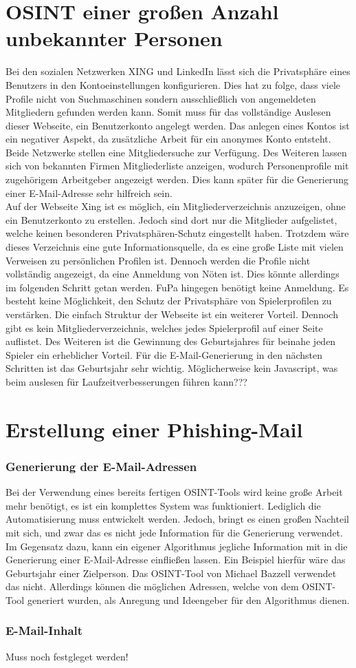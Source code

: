 \section{OSINT einer großen Anzahl unbekannter Personen}
Bei den sozialen Netzwerken XING und LinkedIn lässt sich die Privatsphäre eines Benutzers in den Kontoeinstellungen konfigurieren. Dies hat zu folge, dass viele Profile nicht von Suchmaschinen sondern ausschließlich von angemeldeten Mitgliedern gefunden werden kann. Somit muss für das vollständige Auslesen dieser Webseite, ein Benutzerkonto angelegt werden. Das anlegen eines Kontos ist ein negativer Aspekt, da zusätzliche Arbeit für ein anonymes Konto entsteht.\\ Beide Netzwerke stellen eine Mitgliedersuche zur Verfügung. Des Weiteren lassen sich von bekannten Firmen Mitgliederliste anzeigen, wodurch Personenprofile mit zugehörigem Arbeitgeber angezeigt werden. Dies kann später für die Generierung einer E-Mail-Adresse sehr hilfreich sein.\\
Auf der Webseite Xing ist es möglich, ein Mitgliederverzeichnis anzuzeigen, ohne ein Benutzerkonto zu erstellen. Jedoch sind dort nur die Mitglieder aufgelistet, welche keinen besonderen Privatsphären-Schutz eingestellt haben. Trotzdem wäre dieses Verzeichnis eine gute Informationsquelle, da es eine große Liste mit vielen Verweisen zu persönlichen Profilen ist. Dennoch werden die Profile nicht vollständig angezeigt, da eine Anmeldung von Nöten ist. Dies könnte allerdings im folgenden Schritt getan werden.
FuPa hingegen benötigt keine Anmeldung. Es besteht keine Möglichkeit, den Schutz der Privatsphäre von Spielerprofilen zu verstärken. Die einfach Struktur der Webseite ist ein weiterer Vorteil. Dennoch gibt es kein Mitgliederverzeichnis, welches jedes Spielerprofil auf einer Seite auflistet. Des Weiteren ist die Gewinnung des Geburtsjahres für beinahe jeden Spieler ein erheblicher Vorteil. Für die E-Mail-Generierung in den nächsten Schritten ist das Geburtsjahr sehr wichtig. Möglicherweise kein Javascript, was beim auslesen für Laufzeitverbesserungen führen kann???

\section{Erstellung einer Phishing-Mail}
	\subsubsection{Generierung der E-Mail-Adressen}
	Bei der Verwendung eines bereits fertigen OSINT-Tools wird keine große Arbeit mehr benötigt, es ist ein komplettes System was funktioniert. Lediglich die Automatisierung muss entwickelt werden. Jedoch, bringt es einen großen Nachteil mit sich, und zwar das es nicht jede Information für die Generierung verwendet. Im Gegensatz dazu, kann ein eigener Algorithmus jegliche Information mit in die Generierung einer E-Mail-Adresse einfließen lassen. Ein Beispiel hierfür wäre das Geburtsjahr einer Zielperson. Das OSINT-Tool von Michael Bazzell verwendet das nicht. Allerdings können die möglichen Adressen, welche von dem OSINT-Tool generiert wurden, als Anregung und Ideengeber für den Algorithmus dienen.
	\subsubsection{E-Mail-Inhalt}
	Muss noch festgleget werden!
